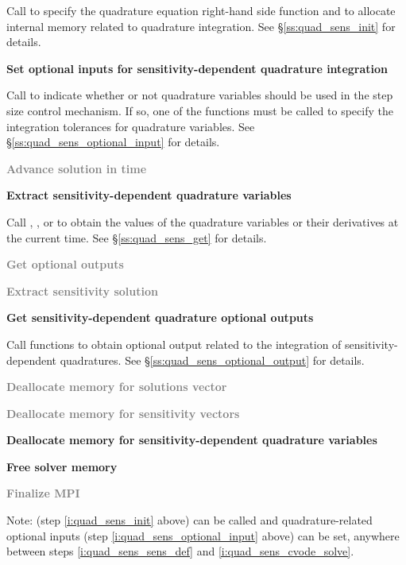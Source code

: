 \begin{Steps}
  Call  to specify the quadrature equation right-hand
  side function and to allocate internal memory related to quadrature integration. 
  See \S\ref{ss:quad_sens_init} for details.

\item\label{i:quad_sens_optional_input}
  {\bf Set optional inputs for sensitivity-dependent quadrature integration}

  Call  to indicate whether or not quadrature variables
  should be used in the step size control mechanism. If so, one of the 
   functions  must be called to specify the integration 
  tolerances for quadrature variables.
  See \S\ref{ss:quad_sens_optional_input} for details.

\item\label{i:quad_sens_cvode_solve}
  \textcolor{gray}{\bf Advance solution in time}

\item
  {\bf Extract sensitivity-dependent quadrature variables}

  Call , ,  or 
   to obtain the values of the quadrature variables or their 
  derivatives at the current time. See \S\ref{ss:quad_sens_get} for details.

\item
  \textcolor{gray}{\bf Get optional outputs}

\item
  \textcolor{gray}{\bf Extract sensitivity solution}

\item
  {\bf Get sensitivity-dependent quadrature optional outputs}

  Call  functions to obtain optional output related to
  the integration of sensitivity-dependent quadratures.
  See \S\ref{ss:quad_sens_optional_output} for details.

\item
  \textcolor{gray}{\bf Deallocate memory for solutions vector}

\item 
  \textcolor{gray}{\bf Deallocate memory for sensitivity vectors}

\item
  {\bf Deallocate memory for sensitivity-dependent quadrature variables}
  
\item
  {\bf Free solver memory}

\item 
  \textcolor{gray}{\bf {\p} Finalize MPI}
  
\end{Steps}
Note:  (step \ref{i:quad_sens_init} above) can
be called and quadrature-related optional inputs (step
\ref{i:quad_sens_optional_input} above) can be set, anywhere between
steps \ref{i:quad_sens_sens_def} and \ref{i:quad_sens_cvode_solve}.

